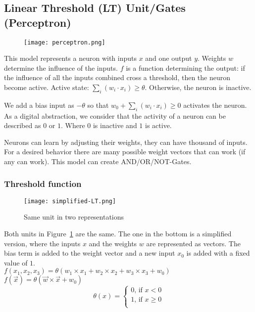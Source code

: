 \documentclass[main]{subfiles}
\begin{document}
\subsection{Linear Threshold (LT) Unit/Gates (Perceptron)}

\begin{figure}[H]
	\centering
	\texttt{[image: perceptron.png]}
\end{figure}

This model represents a neuron with inputs $x$ and one output $y$.
Weights $w$ determine the influence of the inputs.
$f$ is a function determining the output: if the influence of all the inputs combined cross a threshold, then the neuron become active.
Active state: $\sum_i(w_i\cdot x_i) \geq \theta$.
Otherwise, the neuron is inactive.

We add a bias input as $-\theta$ so that $w_0+\sum_i(w_i\cdot x_i)\geq0$ activates the neuron.
As a digital abstraction, we consider that the activity of a neuron can be described as $0$ or $1$. Where $0$ is inactive and $1$ is active.

Neurons can learn by adjusting their weights, they can have thousand of inputs.
For a desired behavior there are many possible weight vectors that can work (if any can work). 
This model can create AND/OR/NOT-Gates.

\subsubsection{Threshold function}

\begin{figure}[H]
	\centering
	\texttt{[image: simplified-LT.png]}
	\caption{Same unit in two representations}
	\label{fig:simplified-LT}
\end{figure}

Both units in Figure~\ref{fig:simplified-LT} are the same.
The one in the bottom is a simplified version, where the inputs $x$ and the weights $w$ are represented as vectors.
The bias term is added to the weight vector and a new input $x_0$ is added with a fixed value of $1$.\\
$f(x_1, x_2, x_3) = \theta(w_1 \times x_1 + w_2 \times x_2 + w_3 \times x_3 + w_0)$\\
$f(\vec{x}) = \theta(\vec{w} \times \vec{x} + w_0)$\\

\[
  \theta(x)=
  \begin{cases}
     0 \text{, if } x < 0\\
     1 \text{, if } x \geq 0\\
  \end{cases}
\]
\end{document}
